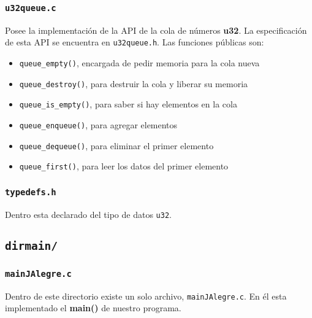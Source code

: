 \documentclass[11pt]{article}   	%
\begin{document}
\subsubsection{\texttt{u32queue.c}}
Posee la implementación de la API de la cola de números \textbf{u32}.
La especificación de esta API se encuentra en \texttt{u32queue.h}.
Las funciones públicas son:

\begin{itemize}
\item \texttt{queue\_empty()}, encargada de pedir memoria para la cola nueva 
\item \texttt{queue\_destroy()}, para destruir la cola y liberar su memoria
\item \texttt{queue\_is\_empty()}, para saber si hay elementos en la cola
\item \texttt{queue\_enqueue()}, para agregar elementos
\item \texttt{queue\_dequeue()}, para eliminar el primer elemento
\item \texttt{queue\_first()}, para leer los datos del primer elemento
\end{itemize}

\subsubsection{\texttt{typedefs.h}}
Dentro esta declarado del tipo de datos \texttt{u32}.

\subsection{\texttt{dirmain/}}
\subsubsection{\texttt{mainJAlegre.c}}
Dentro de este directorio existe un solo archivo, \texttt{mainJAlegre.c}. En él esta implementado el
\textbf{main()} de nuestro programa. 
\end{document}
